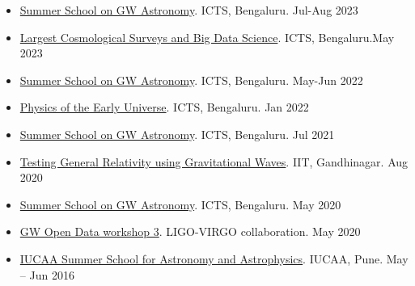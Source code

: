 \begin{itemize}
    \item \href{https://www.icts.res.in/program/gws2023}{Summer School on GW Astronomy}. ICTS, Bengaluru. \hfill{Jul-Aug 2023}
    
    \item \href{https://icts.res.in/program/BigDataCosmo}{Largest Cosmological Surveys and Big Data Science}. ICTS, Bengaluru.\hfill{May 2023}

    \item \href{https://www.icts.res.in/program/gws2022}{Summer School on GW Astronomy}. ICTS, Bengaluru. \hfill{May-Jun 2022}
    
    \item \href{https://www.icts.res.in/program/peu2022}{Physics of the Early Universe}. ICTS, Bengaluru. \hfill{Jan 2022}
    
    \item \href{https://www.icts.res.in/program/gws2021}{Summer School on GW Astronomy}. ICTS, Bengaluru. \hfill{Jul 2021}
    
    \item \href{https://events.iitgn.ac.in/2020/TGRGW/}{Testing General Relativity using Gravitational Waves}. IIT, Gandhinagar. \hfill{Aug 2020}
    
    \item \href{https://www.icts.res.in/program/gws2020}{Summer School on GW Astronomy}. ICTS, Bengaluru. \hfill{May 2020}
    
    \item \href{https://www.gw-openscience.org/static/workshop3/}{GW Open Data workshop 3}. LIGO-VIRGO collaboration. \hfill{May 2020}
    
    \item \href{https://www-apps.iucaa.in/Stu-Prog-ISSIA.html}{IUCAA Summer School for Astronomy and Astrophysics}. IUCAA, Pune. \hfill{May -- Jun 2016}
    
\end{itemize}